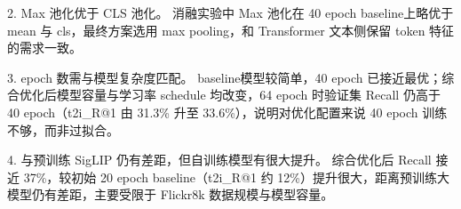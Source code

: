 \documentclass[a4paper]{article}
\begin{document}
2. Max 池化优于 CLS 池化。 消融实验中 Max 池化在 40 epoch baseline上略优于 mean 与 cls，最终方案选用 max pooling，和 Transformer 文本侧保留 token 特征的需求一致。

3. epoch 数需与模型复杂度匹配。 baseline模型较简单，40 epoch 已接近最优；综合优化后模型容量与学习率 schedule 均改变，64 epoch 时验证集 Recall 仍高于 40 epoch（t2i\_R@1 由 31.3\% 升至 33.6\%），说明对优化配置来说 40 epoch 训练不够，而非过拟合。

4. 与预训练 SigLIP 仍有差距，但自训练模型有很大提升。 综合优化后 Recall 接近 37\%，较初始 20 epoch baseline（t2i\_R@1 约 12\%）提升很大，距离预训练大模型仍有差距，主要受限于 Flickr8k 数据规模与模型容量。
\end{document}
